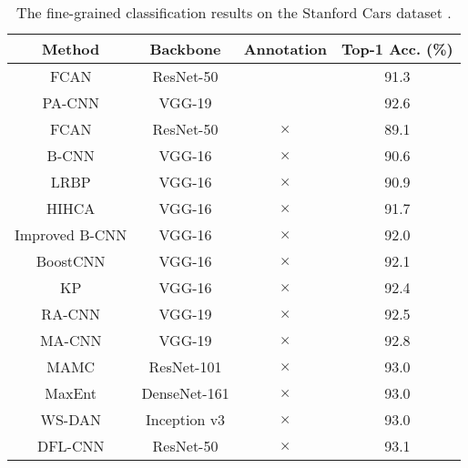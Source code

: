 \documentclass[10pt,twocolumn,letterpaper]{article}
\begin{document}
\begin{table}[t]
    \centering
    \small{ \setlength{\tabcolsep}{1.0pt}
    \caption{The fine-grained classification results on the Stanford Cars dataset \cite{DBLP:conf/iccvw/Krause0DF13}.}
    \vspace{-2mm}
    \label{tab:cars}    
    \begin{tabular}{cccc}
    	\toprule
    	                    Method                      &   Backbone   & Annotation & Top-1 Acc. (\%) \\ \midrule
    	    FCAN \cite{DBLP:journals/corr/LiuXWL16}     &  ResNet-50   & \checkmark &      91.3       \\
    	   PA-CNN \cite{DBLP:conf/cvpr/KrauseJYL15}     &    VGG-19    & \checkmark &      92.6       \\ \midrule
    	    FCAN \cite{DBLP:journals/corr/LiuXWL16}     &  ResNet-50   &  $\times$  &      89.1       \\
    	      B-CNN \cite{DBLP:conf/iccv/LinRM15}       &    VGG-16    &  $\times$  &      90.6       \\
    	    LRBP \cite{DBLP:journals/corr/KongF16}      &    VGG-16    &  $\times$  &      90.9       \\
    	      HIHCA \cite{DBLP:conf/iccv/CaiZZ17}       &    VGG-16    &  $\times$  &      91.7       \\
    	  Improved B-CNN \cite{DBLP:conf/bmvc/LinM17}   &    VGG-16    &  $\times$  &      92.0       \\
    	 BoostCNN \cite{DBLP:conf/bmvc/MoghimiBSYVL16}  &    VGG-16    &  $\times$  &      92.1       \\
    	      KP \cite{DBLP:conf/cvpr/CuiZWLLB17}       &    VGG-16    &  $\times$  &      92.4       \\
    	      RA-CNN \cite{DBLP:conf/cvpr/FuZM17}       &    VGG-19    &  $\times$  &      92.5       \\
    	    MA-CNN \cite{DBLP:conf/iccv/ZhengFML17}     &    VGG-19    &  $\times$  &      92.8       \\
    	      MAMC \cite{DBLP:conf/eccv/SunYZD18}       &  ResNet-101  &  $\times$  &      93.0       \\
    	    MaxEnt \cite{DBLP:conf/nips/DubeyGRN18}     & DenseNet-161 &  $\times$  &      93.0       \\
    	WS-DAN \cite{DBLP:journals/corr/abs-1901-09891} & Inception v3 &  $\times$  &      93.0       \\
    	    DFL-CNN \cite{DBLP:conf/cvpr/WangMD18}      &  ResNet-50   &  $\times$  &      93.1       \\

\end{tabular}}
\end{table}
\end{document}
